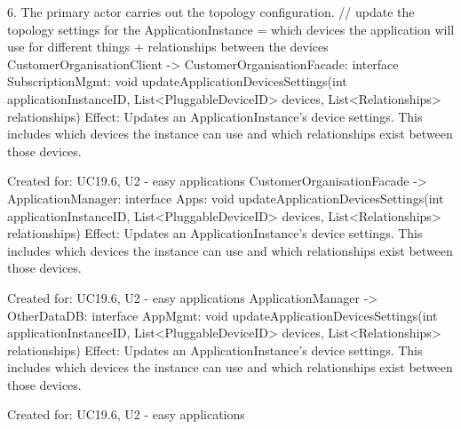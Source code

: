 {{{            6. The primary actor carries out the topology configuration.
                    // update the topology settings for the ApplicationInstance = which devices the application will use for different things + relationships between the devices
                    CustomerOrganisationClient -> CustomerOrganisationFacade: interface SubscriptionMgmt: void updateApplicationDevicesSettings(int applicationInstanceID, List<PluggableDeviceID> devices, List<Relationships> relationships)
                        Effect: Updates an ApplicationInstance's device settings. This includes which devices the instance can use and which relationships exist between those devices.
                        \item Created for: UC19.6, U2 - easy applications
                    CustomerOrganisationFacade -> ApplicationManager:         interface Apps:             void updateApplicationDevicesSettings(int applicationInstanceID, List<PluggableDeviceID> devices, List<Relationships> relationships)
                        Effect: Updates an ApplicationInstance's device settings. This includes which devices the instance can use and which relationships exist between those devices.
                        \item Created for: UC19.6, U2 - easy applications
                    ApplicationManager -> OtherDataDB:                        interface AppMgmt:          void updateApplicationDevicesSettings(int applicationInstanceID, List<PluggableDeviceID> devices, List<Relationships> relationships)
                        Effect: Updates an ApplicationInstance's device settings. This includes which devices the instance can use and which relationships exist between those devices.
                        \item Created for: UC19.6, U2 - easy applications

}}}
